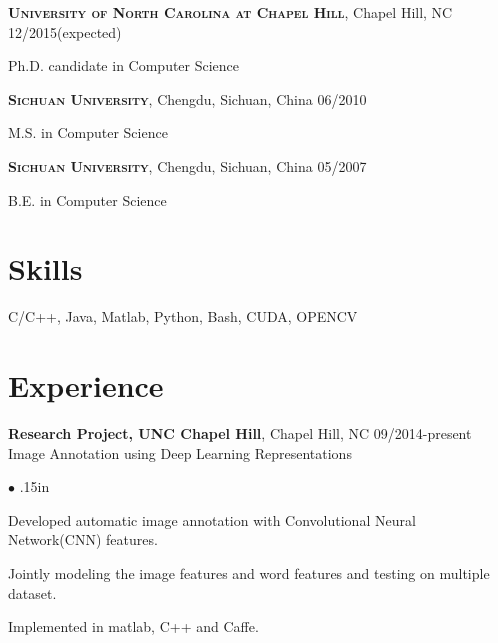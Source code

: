 \documentclass[line,margin]{res}
\newenvironment{bullets}{\begin{list}{\tiny$\bullet$}{\topsep 0pt \itemsep -2pt \leftmargin .15in}}{\vspace*{4pt}\end{list}}
\newenvironment{list1}{
  \begin{list}{\ding{113}}{%
      \setlength{\itemsep}{0in}
      \setlength{\parsep}{0in} \setlength{\parskip}{0in}
      \setlength{\topsep}{0in} \setlength{\partopsep}{0in} 
      \setlength{\leftmargin}{0.17in}}}{\end{list}}
\begin{document}
\begin{resume}
\textsc{\textbf{University of North Carolina at Chapel Hill}}, Chapel Hill, NC \hfill{12/2015(expected)}\\
\vspace*{-.15in}
\begin{list1}
\item[] Ph.D. candidate in Computer Science %
\end{list1}
\vspace*{-.15in}
\textsc{\textbf{Sichuan University}}, Chengdu, Sichuan, China \hfill {06/2010} \\
\vspace*{-.15in}
\begin{list1}
\item[] M.S. in Computer Science  %
\end{list1}
\vspace*{-.15in}
\textsc{\textbf{Sichuan University}}, Chengdu, Sichuan, China \hfill{05/2007}\\
\vspace*{-.15in}
\begin{list1}
\item[] B.E. in Computer Science  %
\end{list1}

\section{\sc Skills}
\smallskip

C/C++, Java, Matlab, Python, Bash, CUDA, OPENCV


\vspace{-.05in}
\section{\sc Experience}
\smallskip

\textbf{Research Project, UNC Chapel Hill}, Chapel Hill, NC  \hfill      09/2014-present \\
Image Annotation using Deep Learning Representations%
\begin{bullets}
	\item Developed automatic image annotation with Convolutional Neural Network(CNN) features.
	\item Jointly modeling the image features and word features and testing on multiple dataset.
	\item Implemented in matlab, C++ and Caffe.
\end{bullets}
\vspace{-.1in}


\end{resume}
\end{document}
